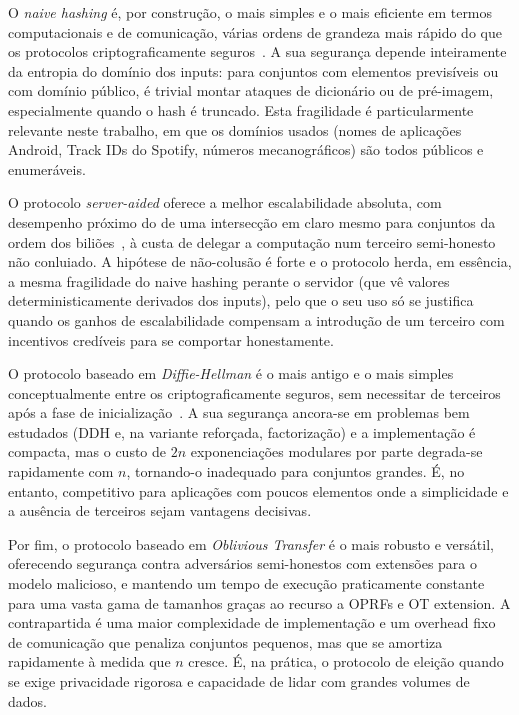 O \emph{naive hashing} é, por construção, o mais simples e o mais eficiente em termos computacionais e de comunicação, várias ordens de grandeza mais rápido do que os protocolos criptograficamente seguros~\cite{pinkas2016scalable}. A sua segurança depende inteiramente da entropia do domínio dos inputs: para conjuntos com elementos previsíveis ou com domínio público, é trivial montar ataques de dicionário ou de pré-imagem, especialmente quando o hash é truncado. Esta fragilidade é particularmente relevante neste trabalho, em que os domínios usados (nomes de aplicações Android, Track IDs do Spotify, números mecanográficos) são todos públicos e enumeráveis.

O protocolo \emph{server-aided} oferece a melhor escalabilidade absoluta, com desempenho próximo do de uma intersecção em claro mesmo para conjuntos da ordem dos biliões~\cite{kamara2014scaling}, à custa de delegar a computação num terceiro semi-honesto não conluiado. A hipótese de não-colusão é forte e o protocolo herda, em essência, a mesma fragilidade do naive hashing perante o servidor (que vê valores deterministicamente derivados dos inputs), pelo que o seu uso só se justifica quando os ganhos de escalabilidade compensam a introdução de um terceiro com incentivos credíveis para se comportar honestamente.

O protocolo baseado em \emph{Diffie-Hellman} é o mais antigo e o mais simples conceptualmente entre os criptograficamente seguros, sem necessitar de terceiros após a fase de inicialização~\cite{meadows1986matchmaking}. A sua segurança ancora-se em problemas bem estudados (DDH e, na variante reforçada, factorização) e a implementação é compacta, mas o custo de $2n$ exponenciações modulares por parte degrada-se rapidamente com $n$, tornando-o inadequado para conjuntos grandes. É, no entanto, competitivo para aplicações com poucos elementos onde a simplicidade e a ausência de terceiros sejam vantagens decisivas.

Por fim, o protocolo baseado em \emph{Oblivious Transfer} é o mais robusto e versátil, oferecendo segurança contra adversários semi-honestos com extensões para o modelo malicioso, e mantendo um tempo de execução praticamente constante para uma vasta gama de tamanhos graças ao recurso a OPRFs e OT extension. A contrapartida é uma maior complexidade de implementação e um overhead fixo de comunicação que penaliza conjuntos pequenos, mas que se amortiza rapidamente à medida que $n$ cresce. É, na prática, o protocolo de eleição quando se exige privacidade rigorosa e capacidade de lidar com grandes volumes de dados.



